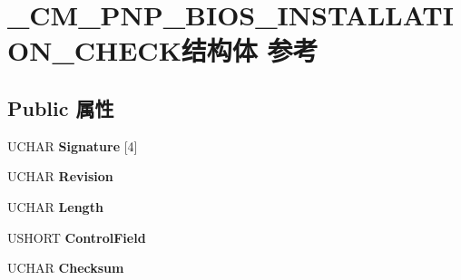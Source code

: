 \hypertarget{struct___c_m___p_n_p___b_i_o_s___i_n_s_t_a_l_l_a_t_i_o_n___c_h_e_c_k}{}\section{\+\_\+\+C\+M\+\_\+\+P\+N\+P\+\_\+\+B\+I\+O\+S\+\_\+\+I\+N\+S\+T\+A\+L\+L\+A\+T\+I\+O\+N\+\_\+\+C\+H\+E\+C\+K结构体 参考}
\label{struct___c_m___p_n_p___b_i_o_s___i_n_s_t_a_l_l_a_t_i_o_n___c_h_e_c_k}
\subsection*{Public 属性}
\begin{DoxyCompactItemize}
\item 
\mbox{\label{struct___c_m___p_n_p___b_i_o_s___i_n_s_t_a_l_l_a_t_i_o_n___c_h_e_c_k_a3f9114c5e61a2feeac772e642d722955}} 
U\+C\+H\+AR {\bfseries Signature} \mbox{[}4\mbox{]}
\item 
\mbox{\label{struct___c_m___p_n_p___b_i_o_s___i_n_s_t_a_l_l_a_t_i_o_n___c_h_e_c_k_a418238968c76dd762f2e7054664cc09c}} 
U\+C\+H\+AR {\bfseries Revision}
\item 
\mbox{\label{struct___c_m___p_n_p___b_i_o_s___i_n_s_t_a_l_l_a_t_i_o_n___c_h_e_c_k_addb5c419aa3a30959b8c896f038b6c48}} 
U\+C\+H\+AR {\bfseries Length}
\item 
\mbox{\label{struct___c_m___p_n_p___b_i_o_s___i_n_s_t_a_l_l_a_t_i_o_n___c_h_e_c_k_a40402c208f0fd751ef065d7e20c77698}} 
U\+S\+H\+O\+RT {\bfseries Control\+Field}
\item 
\mbox{\label{struct___c_m___p_n_p___b_i_o_s___i_n_s_t_a_l_l_a_t_i_o_n___c_h_e_c_k_adb85d97dd853e284bfdb5f43693f87b7}} 
U\+C\+H\+AR {\bfseries Checksum}
\item 
\mbox{\label{struct___c_m___p_n_p___b_i_o_s___i_n_s_t_a_l_l_a_t_i_o_n___c_h_e_c_k_ad3fa73c442bc9ab49030a87ae3deaa78}} 

\end{DoxyCompactItemize}
